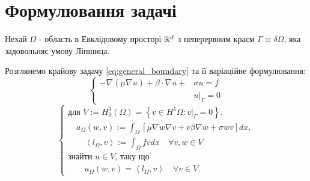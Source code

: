 \clearpage
\section{Формулювання задачі}

Нехай $\Omega$ - область в Евклідовому просторі $\mathbb{R}^d$ з неперервним краєм $\Gamma \equiv \delta \Omega$, яка задовольняє умову Ліпшица.

Розглянемо крайову задачу \eqref{eq:general_boundary} та її варіаційне формулювання:
%
\begin{equation}\label{eq:general_boundary}
	\begin{cases}
			- \nabla (\mu \nabla u) + \beta \cdot \nabla u + &\sigma u = f  \\
			&u|_\Gamma = 0
	\end{cases}
\end{equation}
%
\begin{equation}\label{eq:general_variational}
	\begin{cases}
		\mbox{для } V := H_0^1 \left( \Omega \right) =
		\left\lbrace
			v \in H^1 \Omega : v|_\Gamma = 0
		\right\rbrace, \\

		\quad a_\Omega(w,v) := \displaystyle\int_\Omega
		\left[
			\mu \nabla w \nabla v +v \beta \nabla w + \sigma wv
		\right] dx, \\

		\qquad \left\langle l_\Omega, v \right\rangle := \displaystyle\int_\Omega fvdx \quad \forall v,w \in V \\

		\mbox{знайти }u \in V \mbox{, таку що} \\

		\qquad a_\Omega(w,v) = \left\langle l_\Omega, v \right\rangle \quad \forall v \in V.

	\end{cases}
\end{equation}

